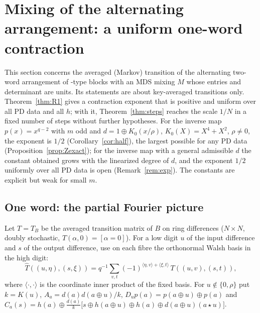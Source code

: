 \section{Mixing of the alternating arrangement: a uniform one-word contraction}\label{sec:mixing}

This section concerns the averaged (Markov) transition of the alternating two-word arrangement of
\cite{FukuiFFA}-type blocks with an MDS mixing $M$ whose entries and determinant are units. Its statements
are about key-averaged transitions only. Theorem~\ref{thm:R1} gives a contraction exponent that is positive and
uniform over all PD data and all $h$; with it, Theorem~\ref{thm:steps} reaches the scale $1/N$ in a fixed number of steps
without further hypotheses. For the inverse map $p(x)=x^{q-2}$ with $m$ odd and $d=1\oplus K_0(x/\rho)$, $K_0(X)=X^4+X^2$, $\rho\ne0$, the
exponent is $1/2$ (Corollary~\ref{cor:half}), the largest possible for any PD data (Proposition~\ref{prop:Zexact}); for the inverse map with a
general admissible $d$ the constant obtained grows with the linearized degree of $d$, and the exponent $1/2$ uniformly over all PD data is
open (Remark~\ref{rem:exp}). The constants are explicit but weak for small $m$.

\subsection{One word: the partial Fourier picture}
Let $T=T_B$ be the averaged transition matrix of $B$ on ring differences ($N\times N$, doubly stochastic,
$T(\alpha,0)=[\alpha=0]$). For a low digit $u$ of the input difference and $s$ of the output difference, use on
each fibre the orthonormal Walsh basis in the high digit:
\[
\widehat T((u,\eta),(s,\xi))=q^{-1}\sum_{v,t}(-1)^{\langle\eta,v\rangle+\langle\xi,t\rangle}\,T((u,v),(s,t)),
\]
where $\langle\cdot,\cdot\rangle$ is the coordinate inner product of the fixed basis. For $u\notin\{0,\rho\}$ put
$k=K(u)$, $A_a=d(a)d(a\oplus u)/k$, $D_up(a)=p(a\oplus u)\oplus p(a)$ and
$C_a(s)=h(a)\oplus\frac{d(a)}{k}\bigl[s\oplus h(a\oplus u)\oplus h(a)\oplus d(a\oplus u)(a\star u)\bigr]$.

